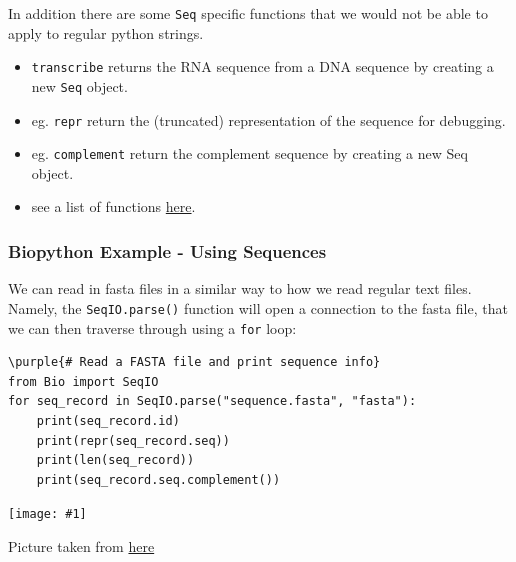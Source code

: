 \documentclass[xcolor=svgnames, handout]{beamer}
\newcommand{\purple}[1]{{\textcolor{purple}{#1}}}
\newcommand{\nl}{\\[1em]}
\newcommand{\ipic}[2]{\texttt{[image: \#1]}}
\newcommand{\ft}[1]{\frametitle{#1}}
\begin{document}
\begin{frame}
In addition there are some {\tt Seq} specific functions that we would not be able to apply to regular python strings. 
\begin{itemize}
\item  	
{\tt transcribe}
returns the RNA sequence from a DNA sequence by creating a new {\tt Seq} object.
\item eg. {\tt repr} return the (truncated) representation of the sequence for debugging.
\item eg. {\tt complement} return the complement sequence by creating a new Seq object.
\item see a list of functions \href{https://biopython.org/DIST/docs/api/Bio.Seq.Seq-class.html}{here}.
\end{itemize}

\end{frame}




\begin{frame}[fragile]\ft{Biopython Example - Using Sequences}
We can read in fasta files in a similar way to how we read regular text files.\nl
Namely, the {\tt SeqIO.parse()} function will open a connection to the fasta file, that we can then traverse through using a {\tt for} loop:
\begin{Verbatim}[commandchars=\\\{\}]
\purple{# Read a FASTA file and print sequence info}
from Bio import SeqIO
for seq_record in SeqIO.parse("sequence.fasta", "fasta"):
    print(seq_record.id)
    print(repr(seq_record.seq))
    print(len(seq_record))
    print(seq_record.seq.complement())
\end{Verbatim}
\end{frame}



\begin{frame}
\ipic{img/dna}{0.9}

Picture taken from \href{https://www.khanacademy.org/science/biology/gene-expression-central-dogma/transcription-of-dna-into-rna/a/overview-of-transcription}{here}
\end{frame}
\end{document}
